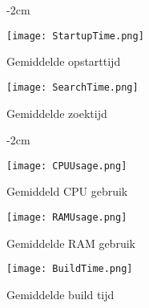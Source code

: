 \begin{figure}[h]
    \centering
    \addtolength{\leftskip} {-2cm}
    \addtolength{\rightskip}{-2cm}
    \begin{minipage}{0.6\linewidth}
        \texttt{[image: StartupTime.png]}
        \vspace*{-1.4cm}
        \caption{Gemiddelde opstarttijd}
        \label{fig:startupTime}
    \end{minipage}%
    \begin{minipage}{0.6\linewidth}
        \texttt{[image: SearchTime.png]}
        \vspace*{-1.4cm}
        \caption{Gemiddelde zoektijd}
        \label{fig:searchTime}
    \end{minipage}
\end{figure}

\begin{figure}[h]
    \centering
    \addtolength{\leftskip} {-2cm}
    \addtolength{\rightskip}{-2cm}
    \begin{minipage}{0.6\linewidth}
        \texttt{[image: CPUUsage.png]}
        \vspace*{-1.4cm}
        \caption{Gemiddeld CPU gebruik}
        \label{fig:CPUUsage}
    \end{minipage}%
    \begin{minipage}{0.6\linewidth}
        \texttt{[image: RAMUsage.png]}
        \vspace*{-1.4cm}
        \caption{Gemiddelde RAM gebruik}
        \label{fig:RAMUsage}
    \end{minipage}
\end{figure}

\begin{figure}[h!]
    \centering
    \begin{minipage}{0.6\linewidth}
        \texttt{[image: BuildTime.png]}
        \vspace*{-1.4cm}
        \caption{Gemiddelde build tijd}
        \label{fig:buildTime}
    \end{minipage}%
\end{figure}
